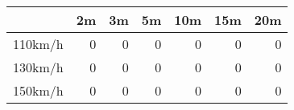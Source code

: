 \begin{tabular}{lrrrrrr}
\hline
         &   2m &   3m &   5m &   10m &   15m &   20m \\
\hline
 110km/h &    0 &    0 &    0 &     0 &     0 &     0 \\
 130km/h &    0 &    0 &    0 &     0 &     0 &     0 \\
 150km/h &    0 &    0 &    0 &     0 &     0 &     0 \\
\hline
\end{tabular}
